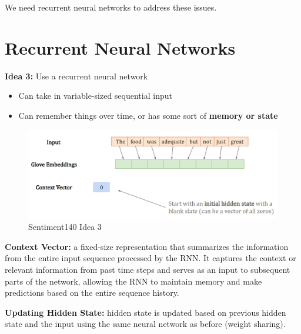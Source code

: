 We need recurrent neural networks to address these issues.

\section{Recurrent Neural Networks}
\textbf{Idea 3:} Use a recurrent neural network
\begin{itemize}
    \item Can take in variable-sized sequential input
    \item Can remember things over time, or has some sort of \textbf{memory or state}
\end{itemize}

\begin{figure}[h!t]
    \centering
    \includegraphics[width=0.9\linewidth]{rnnidea3.png}
    \caption{Sentiment140 Idea 3}
    \label{fig:enter-label}
\end{figure}

\begin{definition}
    \textbf{Context Vector:} a fixed-size representation that summarizes the information from the entire input sequence processed by the RNN. It captures the context or relevant information from past time steps and serves as an input to subsequent parts of the network, allowing the RNN to maintain memory and make predictions based on the entire sequence history.
\end{definition}

\textbf{Updating Hidden State:} hidden state is updated based on previous hidden state and the input using the
same neural network as before (weight sharing).\\

